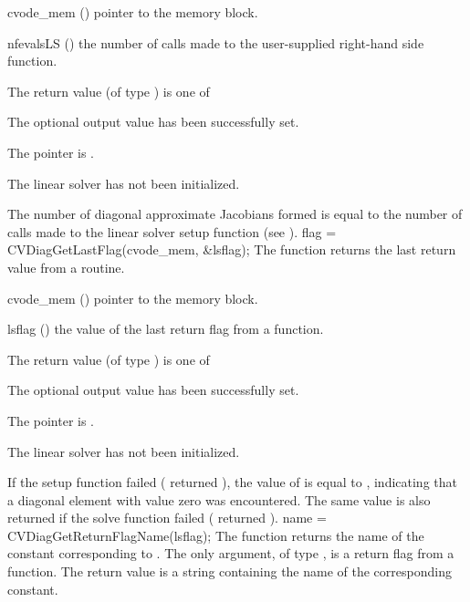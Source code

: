 {
  \begin{args}
  \item[cvode\_mem] ()
    pointer to the {\cvode} memory block.
  \item[nfevalsLS] ()
    the number of calls made to the user-supplied right-hand side function.
  \end{args}
}
{
  The return value  (of type ) is one of
  \begin{args}
  \item[\Id{CVDIAG\_SUCCESS}] 
    The optional output value has been successfully set.
  \item[\Id{CVDIAG\_MEM\_NULL}]
    The  pointer is .
  \item[\Id{CVDIAG\_LMEM\_NULL}]
    The {\cvdiag} linear solver has not been initialized.
  \end{args}
}
{
  The number of diagonal approximate Jacobians formed is
  equal to the number of calls made to the linear solver setup function
  (see ).
}
{
  flag = CVDiagGetLastFlag(cvode\_mem, \&lsflag);
}
{
  The function  returns the
  last return value from a {\cvdiag} routine. 
}
{
  \begin{args}
  \item[cvode\_mem] ()
    pointer to the {\cvode} memory block.
  \item[lsflag] ()
    the value of the last return flag from a {\cvdiag} function.
  \end{args}
}
{
  The return value  (of type ) is one of
  \begin{args}
  \item[\Id{CVDIAG\_SUCCESS}] 
    The optional output value has been successfully set.
  \item[\Id{CVDIAG\_MEM\_NULL}]
    The  pointer is .
  \item[\Id{CVDIAG\_LMEM\_NULL}]
    The {\cvdiag} linear solver has not been initialized.
  \end{args}
}
{
  If the {\cvdiag} setup function failed ( returned ),
  the value of  is equal to , indicating that a
  diagonal element with value zero was encountered.
  The same value is also returned if the {\cvdiag} solve function failed
  ( returned ).
}
{
  name = CVDiagGetReturnFlagName(lsflag);
}
{
  The function  returns the
  name of the {\cvdiag} constant corresponding to .
}
{
  The only argument, of type , is a return flag from a {\cvdiag} function.
}
{
  The return value is a string containing the name of the corresponding constant.
}
{}


